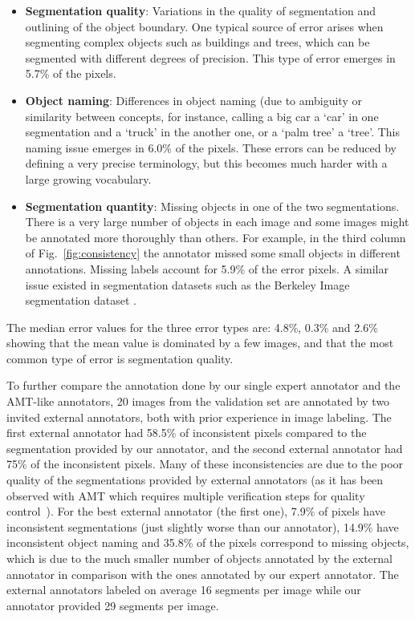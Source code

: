 \begin{itemize}    
\item   {\bf Segmentation quality}: Variations in the quality of segmentation and outlining of the object boundary. One typical source of error arises when segmenting complex objects such as buildings and trees, which can be segmented with different degrees of precision. This type of error emerges in 5.7\% of the pixels.

\item   {\bf Object naming}: Differences in object naming (due to ambiguity or similarity between concepts, for instance, calling a big car a `car' in one segmentation and a `truck' in the another one, or a `palm tree' a `tree'. This naming issue emerges in 6.0\% of the pixels. These errors can be reduced by defining a very precise terminology, but this becomes much harder with a large growing vocabulary.

\item   {\bf Segmentation quantity}: Missing objects in one of the two segmentations. There is a very large number of objects in each image and some images might be annotated more thoroughly than others. For example, in the third column of Fig.~\ref{fig:consistency} the annotator missed some small objects in different annotations. Missing labels account for 5.9\% of the error pixels. A similar issue existed in segmentation datasets such as the Berkeley Image segmentation dataset \citep{MartinFTM01}.
\end{itemize}

The median error values for the three error types are: 4.8\%, 0.3\% and 2.6\% showing that the mean value is dominated by a few images, and that the most common type of error is segmentation quality. 

To further compare the annotation done by our single expert annotator and the AMT-like annotators, 20 images from the validation set are annotated by two invited external annotators, both with prior experience in image labeling. The first external annotator had 58.5\% of inconsistent pixels compared to the segmentation provided by our annotator, and the second external annotator had 75\% of the inconsistent pixels. Many of these inconsistencies are due to the poor quality of the segmentations provided by external annotators (as it has been observed with AMT which requires multiple verification steps for quality control~\citep{lin2014microsoft}). For the best external annotator (the first one), 7.9\% of pixels have inconsistent segmentations (just slightly worse than our annotator), 14.9\% have inconsistent object naming and 35.8\% of the pixels correspond to missing objects, which is due to the much smaller number of objects annotated by the external annotator in comparison with the ones annotated by our expert annotator. The external annotators labeled on average 16 segments per image while our annotator provided 29 segments per image. 


